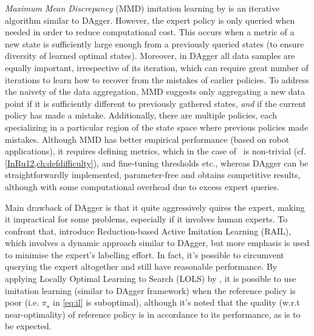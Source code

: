 



\emph{Maximum Mean Discrepancy} (MMD) imitation learning by \cite{Kim13} is an 
iterative algorithm similar to DAgger. 
However, the expert policy is only queried when needed in order to reduce 
computational cost. 
This occurs when a metric of a new state is sufficiently large enough from a 
previously queried states (to ensure diversity of learned optimal states). 
Moreover, in DAgger all data samples are equally important, irrespective of its 
iteration, which can require great number of iterations to learn how to recover 
from the mistakes of earlier policies. To address the naivety of the data 
aggregation, MMD suggests only aggregating a new data point 
if it is sufficiently different to previously gathered states, \emph{and} if 
the current policy has made a mistake. 
Additionally, there are multiple policies, each specializing in a particular 
region of the state space where previous policies made mistakes.
Although MMD has better empirical performance (based on robot applications), it 
requires defining metrics, which in the case of \jsp\ is non-trivial (cf. 
\cref{InRu12,ch:defdifficulty}), and fine-tuning thresholds etc., whereas 
DAgger can be straightforwardly implemented, parameter-free and obtains 
competitive results, although with some computational overhead due to excess 
expert queries. 

Main drawback of DAgger is that it quite aggressively quires the expert, making 
it impractical for some problems, especially if it involves human experts. 
To confront that, \cite{Judah12} introduce Reduction-based Active Imitation 
Learning (RAIL), which involves a dynamic approach similar to DAgger, but more 
emphasis is used to minimise the expert's labelling effort.
In fact, it's possible to circumvent querying the expert altogether and still 
have reasonable performance. By applying Locally Optimal Learning to Search 
(LOLS) by \cite{ChangKADL15}, it is possible to use imitation learning (similar to 
DAgger framework) when the reference policy is poor (i.e. $\pi_\star$ in 
\cref{eq:il} is suboptimal), 
although it's noted that the quality (w.r.t near-optimality) of reference 
policy is in accordance to its performance, as is to be expected. 
